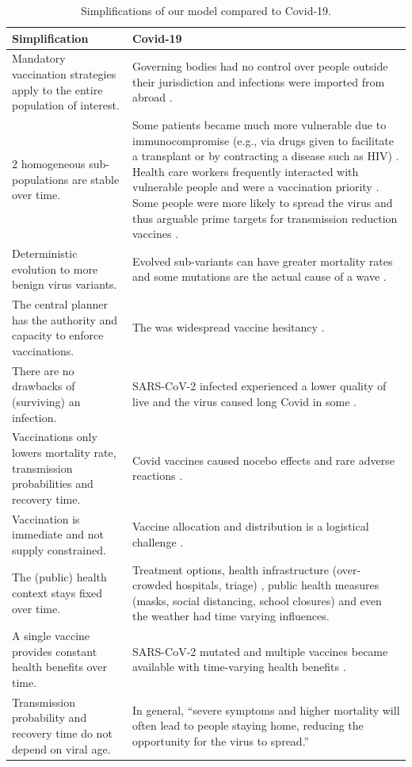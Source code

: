 \documentclass[a4paper,12pt]{article}
\begin{document}
\newpage
\begin{table}[h!]
\begin{tabularx}{\textwidth}{|X|X|}
\hline
Simplification & Covid-19\\\hline
Mandatory vaccination strategies apply to the entire population of interest. &Governing bodies had no control over people outside their jurisdiction and infections were imported from abroad \cite{Williams2021}.\\\hline
2 homogeneous sub-populations are stable over time.& Some patients became much more vulnerable due to immunocompromise (e.g., via drugs given to facilitate a transplant or by contracting a disease such as HIV)  \cite{Fung2020}.  Health care workers frequently interacted with vulnerable people and were a vaccination priority \cite{Kelsall2025}. Some people were more likely to spread the virus and thus arguable prime targets for transmission reduction vaccines \cite{rhodes2021justice}.\\\hline
Deterministic evolution to more benign virus variants. & Evolved sub-variants can have greater mortality rates and some mutations are the actual cause of a wave \cite{Kun2023}.\\\hline
The central planner has the authority and capacity to enforce vaccinations.& The was widespread vaccine hesitancy \cite{Yeboah2025}.\\\hline%
There are no drawbacks of (surviving) an infection. & SARS-CoV-2 infected experienced a lower quality of live and the virus caused long Covid in some \cite{Cutler2022}.\\\hline
Vaccinations only lowers mortality rate, transmission probabilities and recovery time.& Covid vaccines caused nocebo effects \cite{Sever2022a} and rare adverse reactions \cite{Sessa2021}.\\\hline
Vaccination is immediate and not supply constrained. & Vaccine allocation and distribution is a logistical challenge \cite{Muckstadt2023}.\\\hline
The (public) health context stays fixed over time. & Treatment options, health infrastructure (over-crowded hospitals, triage) \cite{Feinstein2020}, public health measures (masks, social distancing, school closures) \cite{Lison2023} and even the weather \cite{Majumder2021} had time varying influences.\\\hline
A single vaccine provides constant health benefits over time.& SARS-CoV-2 mutated \cite{Bruessow2022} and multiple vaccines became available \cite{Li2022b} with time-varying health benefits \cite{Shrestha2024}.\\\hline
Transmission probability and recovery time do not depend on viral age. & In general, ``severe symptoms and higher mortality will often lead to people staying home, reducing the opportunity for the virus to spread.'' \cite[P.\ 6]{Jones2024}\\\hline
\end{tabularx}
\caption{Simplifications of our model compared to Covid-19.}
\label{tab:Simplifications}
\end{table}
\end{document}
